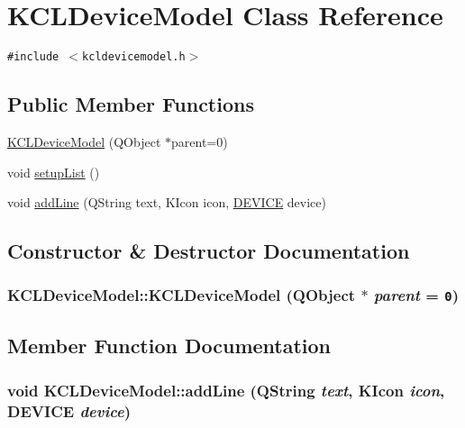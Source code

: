 \hypertarget{class_k_c_l_device_model}{
\section{KCLDeviceModel Class Reference}
\label{class_k_c_l_device_model}
}
{\tt \#include $<$kcldevicemodel.h$>$}

\subsection*{Public Member Functions}
\begin{CompactItemize}
\item 
\hyperlink{class_k_c_l_device_model_4015fbee857e468d75861e2aa13e5653}{KCLDeviceModel} (QObject $\ast$parent=0)
\item 
void \hyperlink{class_k_c_l_device_model_ed625ef5cc19fc60dfc92861b64d9656}{setupList} ()
\item 
void \hyperlink{class_k_c_l_device_model_b9f26d59942f74cf73605a7d1a445c2d}{addLine} (QString text, KIcon icon, \hyperlink{kclinput_8h_833b28f90e109607cd5d9e826474893a}{DEVICE} device)
\end{CompactItemize}


\subsection{Constructor \& Destructor Documentation}
\hypertarget{class_k_c_l_device_model_4015fbee857e468d75861e2aa13e5653}{
\subsubsection[{KCLDeviceModel}]{\setlength{\rightskip}{0pt plus 5cm}KCLDeviceModel::KCLDeviceModel (QObject $\ast$ {\em parent} = {\tt 0})}}
\label{class_k_c_l_device_model_4015fbee857e468d75861e2aa13e5653}




\subsection{Member Function Documentation}
\hypertarget{class_k_c_l_device_model_b9f26d59942f74cf73605a7d1a445c2d}{
\subsubsection[{addLine}]{\setlength{\rightskip}{0pt plus 5cm}void KCLDeviceModel::addLine (QString {\em text}, \/  KIcon {\em icon}, \/  {\bf DEVICE} {\em device})}}
\label{class_k_c_l_device_model_b9f26d59942f74cf73605a7d1a445c2d}


